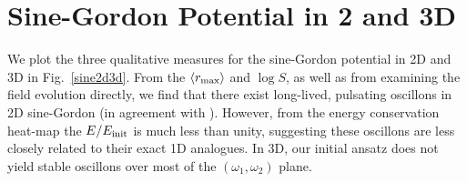 \documentclass{report}
\begin{document}
\section{Sine-Gordon Potential in 2 and 3D}

We plot the three qualitative measures for the sine-Gordon potential in 2D and 3D in Fig.~\ref{sine2d3d}. From the $\langle r_{\rm max}\rangle$ and $\log{S}$, as well as from examining the field evolution directly, we find that there exist long-lived, pulsating oscillons in 2D sine-Gordon (in agreement with  \cite{Hindmarsh:2006ur}). However, from the energy conservation heat-map the $E/E_{\rm init}$ is much less than unity, suggesting these oscillons are less closely related to their exact 1D analogues. In 3D, our initial ansatz does not yield stable oscillons over most of the $(\omega_1,\omega_2)$ plane.
\end{document}
